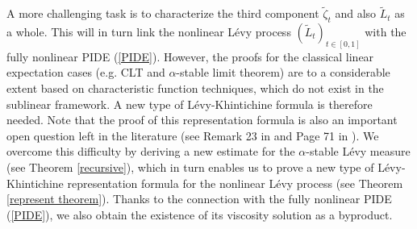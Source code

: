 \documentclass[a4paper,oneside,10pt]{article}%
\numberwithin{equation}{section}
\begin{document}
A more challenging task is to characterize the third component $\tilde{\zeta
}_{t}$ and also $\tilde{L}_{t}$ as a whole. This will in turn link the
nonlinear L\'evy process $(\tilde{L}_{t})_{t\in[0,1]}$ with the fully
nonlinear PIDE (\ref{PIDE}). However, the proofs for the classical linear
expectation cases (e.g. CLT and $\alpha$-stable limit theorem) are to a
considerable extent based on characteristic function techniques, which do not
exist in the sublinear framework. A new type of L\'evy-Khintichine formula is
therefore needed. Note that the proof of this representation formula is also
an important open question left in the literature (see Remark 23 in
\cite{HP2021} and Page 71 in \cite{NN2017}). We overcome this difficulty by
deriving a new estimate for the $\alpha$-stable L\'{e}vy measure (see Theorem
\ref{recursive}), which in turn enables us to prove a new type of
L\'evy-Khintichine representation formula for the nonlinear L\'evy process
(see Theorem \ref{represent theorem}). Thanks to the connection with the fully
nonlinear PIDE (\ref{PIDE}), we also obtain the existence of its viscosity
solution as a byproduct.
\end{document}
